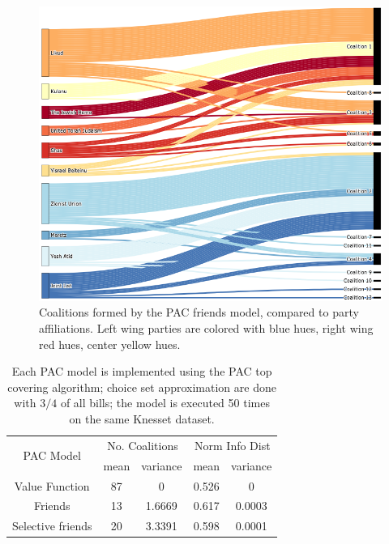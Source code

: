 \documentclass[letterpaper]{article} %
\theoremstyle{definition}
\begin{document}
\begin{figure}[htb]
\includegraphics[width=\columnwidth]{pac_friends}
\caption{Coalitions formed by the PAC friends model, compared to party affiliations. Left wing parties are colored with blue hues, right wing red hues, center yellow hues.}
\end{figure}

\begin{table}[h!]
\centering
\begin{tabular}{c|c|c|c|c}
\hline
\multirow{2}{*}{ PAC Model } & \multicolumn{2}{c|}{ No. Coalitions } & \multicolumn{2}{|c}{ Norm Info Dist } \\
& mean & variance & mean & variance \\
\hline
Value Function & 87 & 0 & 0.526 & 0 \\
Friends & 13 & 1.6669 & 0.617 & 0.0003 \\
Selective friends & 20 & 3.3391 & 0.598 & 0.0001 \\
\hline
\end{tabular}
\caption{Each PAC model is implemented using the PAC top covering algorithm; choice set approximation are done with $3/4$ of all bills; the model is executed 50 times on the same Knesset dataset.}
\label{table:pac_models}
\end{table}



\end{document}

